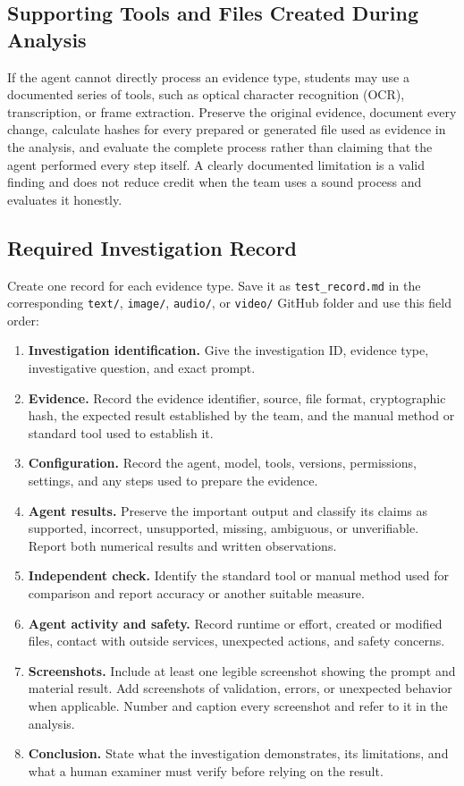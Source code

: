 \documentclass[12pt,letterpaper]{article}
\begin{document}
\subsection{Supporting Tools and Files Created During Analysis}
If the agent cannot directly process an evidence type, students may use a documented series of tools, such as optical character recognition (OCR), transcription, or frame extraction. Preserve the original evidence, document every change, calculate hashes for every prepared or generated file used as evidence in the analysis, and evaluate the complete process rather than claiming that the agent performed every step itself. A clearly documented limitation is a valid finding and does not reduce credit when the team uses a sound process and evaluates it honestly.

\subsection{Required Investigation Record}
Create one record for each evidence type. Save it as \texttt{test\_record.md} in the corresponding \texttt{text/}, \texttt{image/}, \texttt{audio/}, or \texttt{video/} GitHub folder and use this field order:
\begin{enumerate}
    \item \textbf{Investigation identification.} Give the investigation ID, evidence type, investigative question, and exact prompt.
    \item \textbf{Evidence.} Record the evidence identifier, source, file format, cryptographic hash, the expected result established by the team, and the manual method or standard tool used to establish it.
    \item \textbf{Configuration.} Record the agent, model, tools, versions, permissions, settings, and any steps used to prepare the evidence.
    \item \textbf{Agent results.} Preserve the important output and classify its claims as supported, incorrect, unsupported, missing, ambiguous, or unverifiable. Report both numerical results and written observations.
    \item \textbf{Independent check.} Identify the standard tool or manual method used for comparison and report accuracy or another suitable measure.
    \item \textbf{Agent activity and safety.} Record runtime or effort, created or modified files, contact with outside services, unexpected actions, and safety concerns.
    \item \textbf{Screenshots.} Include at least one legible screenshot showing the prompt and material result. Add screenshots of validation, errors, or unexpected behavior when applicable. Number and caption every screenshot and refer to it in the analysis.
    \item \textbf{Conclusion.} State what the investigation demonstrates, its limitations, and what a human examiner must verify before relying on the result.
\end{enumerate}
\end{document}
